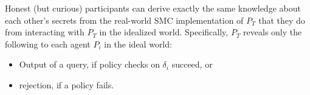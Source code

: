 \documentclass[10pt]{sigplanconf}
\newcommand{\mwh}[1]{\textcolor{purple}{MWH -- #1}}
\newcommand{\mwh}[1]{}
\begin{document}

\begin{remark} \label{remark:ideal-real} Honest (but curious) participants can derive
exactly the same knowledge about each other's secrets from
the real-world SMC implementation of $ P_T $ that
they do from interacting with $ P_T $ in the idealized world.
%
Specifically, $ P_T $ reveals only the following to each agent $ P_i $ in
the ideal world:
\begin{itemize}
\item{} Output of a query, if policy checks on $ \delta_i $ succeed, or
\item{} rejection, if a policy fails.
\end{itemize}
\end{remark}


%



\end{document}
